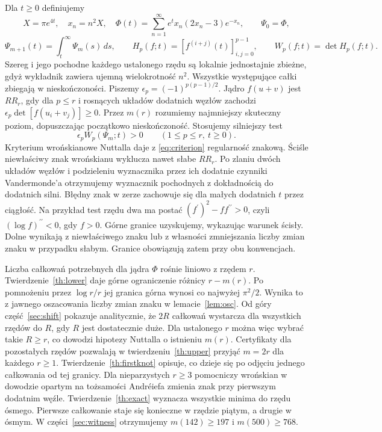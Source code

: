 \documentclass[11pt,a4paper,reqno]{amsart}
\numberwithin{equation}{section}
\begin{document}
Dla \(t\ge0\) definiujemy \[X=\pi e^{4t},\quad x_n=n^2X,\quad \Phi(t)=\sum_{n=1}^{\infty}e^t x_n(2x_n-3)e^{-x_n},\qquad \Psi_0=\Phi,\] \[\Psi_{m+1}(t)=\int_t^\infty\Psi_m(s)\,ds,\qquad
H_p(f;t)=[f^{(i+j)}(t)]_{i,j=0}^{p-1},\qquad W_p(f;t)=\det H_p(f;t).\] Szereg i jego pochodne każdego ustalonego rzędu są lokalnie jednostajnie zbieżne, gdyż wykładnik zawiera ujemną wielokrotność \(n^2\). Wszystkie występujące całki zbiegają w nieskończoności. Piszemy \(\epsilon_p=(-1)^{p(p-1)/2}\). Jądro \(f(u+v)\) jest \(RR_r\), gdy dla \(p\le r\) i rosnących układów dodatnich węzłów zachodzi \(\epsilon_p\det[f(u_i+v_j)]\ge0\). Przez \(m(r)\) rozumiemy najmniejszy skuteczny poziom, dopuszczając początkowo nieskończoność. Stosujemy silniejszy test 
\begin{equation}\label{eq:criterion}
\epsilon_p W_p(\Psi_m;t)>0 \qquad(1\le p\le r,\ t\ge0).
\end{equation}
 Kryterium wrońskianowe Nuttalla \cite[lemat 2.1]{nuttall} daje z \eqref{eq:criterion} regularność znakową. Ściśle niewłaściwy znak wrońskianu wyklucza nawet słabe \(RR_r\). Po zlaniu dwóch układów węzłów i podzieleniu wyznacznika przez ich dodatnie czynniki Vandermonde'a otrzymujemy wyznacznik pochodnych z dokładnością do dodatnich silni. Błędny znak w zerze zachowuje się dla małych dodatnich \(t\) przez ciągłość. Na przykład test rzędu dwa ma postać \((f^{\prime})^2-ff^{\prime\prime}>0\), czyli \((\log f)^{\prime\prime}<0\), gdy \(f>0\). Górne granice uzyskujemy, wykazując warunek ścisły. Dolne wynikają z niewłaściwego znaku lub z własności zmniejszania liczby zmian znaku w przypadku słabym. Granice obowiązują zatem przy obu konwencjach.

Liczba całkowań potrzebnych dla jądra \(\Phi\) rośnie liniowo z rzędem \(r\). Twierdzenie~\ref{th:lower} daje górne ograniczenie różnicy \(r-m(r)\). Po pomnożeniu przez \(\log r/r\) jej granica górna wynosi co najwyżej \(\pi^2/2\). Wynika to z jawnego oszacowania liczby zmian znaku w lemacie~\ref{lem:osc}. Od góry część~\ref{sec:shift} pokazuje analitycznie, że \(2R\) całkowań wystarcza dla wszystkich rzędów do \(R\), gdy \(R\) jest dostatecznie duże. Dla ustalonego \(r\) można więc wybrać takie \(R\ge r\), co dowodzi hipotezy Nuttalla o istnieniu \(m(r)\). Certyfikaty dla pozostałych rzędów pozwalają w twierdzeniu~\ref{th:upper} przyjąć \(m=2r\) dla każdego \(r\ge1\). Twierdzenie~\ref{th:firstknot} opisuje, co dzieje się po odjęciu jednego całkowania od tej granicy. Dla nieparzystych \(r\ge3\) pomocniczy wrońskian w dowodzie opartym na tożsamości Andréiefa zmienia znak przy pierwszym dodatnim węźle. Twierdzenie~\ref{th:exact} wyznacza wszystkie minima do rzędu ósmego. Pierwsze całkowanie staje się konieczne w rzędzie piątym, a drugie w ósmym. W części~\ref{sec:witness} otrzymujemy \(m(142)\ge197\) i \(m(500)\ge768\).
\end{document}
